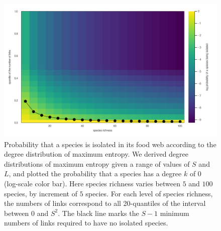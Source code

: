 \documentclass[
  12pt,
]{article}
\begin{document}
\begin{figure}
\hypertarget{fig:heatmap}{%
\centering
\includegraphics{figures/heatmap_disconnected.png}
\caption{Probability that a species is isolated in its food web
according to the degree distribution of maximum entropy. We derived
degree distributions of maximum entropy given a range of values of \(S\)
and \(L\), and plotted the probability that a species has a degree \(k\)
of \(0\) (log-scale color bar). Here species richness varies between
\(5\) and \(100\) species, by increment of \(5\) species. For each level
of species richness, the numbers of links correspond to all 20-quantiles
of the interval between \(0\) and \(S^2\). The black line marks the
\(S-1\) minimum numbers of links required to have no isolated
species.}\label{fig:heatmap}
}
\end{figure}
\end{document}
